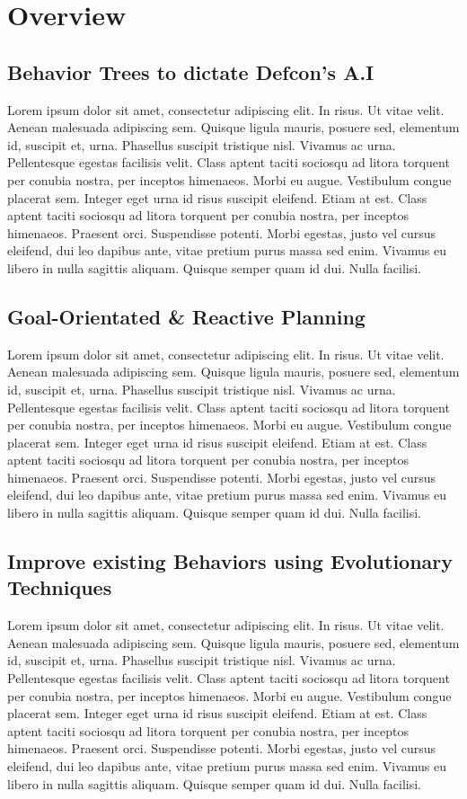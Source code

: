 \chapter{Overview}
    \section{Behavior Trees to dictate Defcon's A.I}
    Lorem ipsum dolor sit amet, consectetur adipiscing elit. In risus. Ut vitae velit. Aenean malesuada adipiscing sem. Quisque ligula mauris, posuere sed, elementum id, suscipit et, urna. Phasellus suscipit tristique nisl. Vivamus ac urna. Pellentesque egestas facilisis velit. Class aptent taciti sociosqu ad litora torquent per conubia nostra, per inceptos himenaeos. Morbi eu augue. Vestibulum congue placerat sem. Integer eget urna id risus suscipit eleifend. Etiam at est. Class aptent taciti sociosqu ad litora torquent per conubia nostra, per inceptos himenaeos. Praesent orci. Suspendisse potenti. Morbi egestas, justo vel cursus eleifend, dui leo dapibus ante, vitae pretium purus massa sed enim. Vivamus eu libero in nulla sagittis aliquam. Quisque semper quam id dui. Nulla facilisi. 
    \section{Goal-Orientated \& Reactive Planning}
    Lorem ipsum dolor sit amet, consectetur adipiscing elit. In risus. Ut vitae velit. Aenean malesuada adipiscing sem. Quisque ligula mauris, posuere sed, elementum id, suscipit et, urna. Phasellus suscipit tristique nisl. Vivamus ac urna. Pellentesque egestas facilisis velit. Class aptent taciti sociosqu ad litora torquent per conubia nostra, per inceptos himenaeos. Morbi eu augue. Vestibulum congue placerat sem. Integer eget urna id risus suscipit eleifend. Etiam at est. Class aptent taciti sociosqu ad litora torquent per conubia nostra, per inceptos himenaeos. Praesent orci. Suspendisse potenti. Morbi egestas, justo vel cursus eleifend, dui leo dapibus ante, vitae pretium purus massa sed enim. Vivamus eu libero in nulla sagittis aliquam. Quisque semper quam id dui. Nulla facilisi. 
    \section{Improve existing Behaviors using Evolutionary Techniques }
    Lorem ipsum dolor sit amet, consectetur adipiscing elit. In risus. Ut vitae velit. Aenean malesuada adipiscing sem. Quisque ligula mauris, posuere sed, elementum id, suscipit et, urna. Phasellus suscipit tristique nisl. Vivamus ac urna. Pellentesque egestas facilisis velit. Class aptent taciti sociosqu ad litora torquent per conubia nostra, per inceptos himenaeos. Morbi eu augue. Vestibulum congue placerat sem. Integer eget urna id risus suscipit eleifend. Etiam at est. Class aptent taciti sociosqu ad litora torquent per conubia nostra, per inceptos himenaeos. Praesent orci. Suspendisse potenti. Morbi egestas, justo vel cursus eleifend, dui leo dapibus ante, vitae pretium purus massa sed enim. Vivamus eu libero in nulla sagittis aliquam. Quisque semper quam id dui. Nulla facilisi. 

